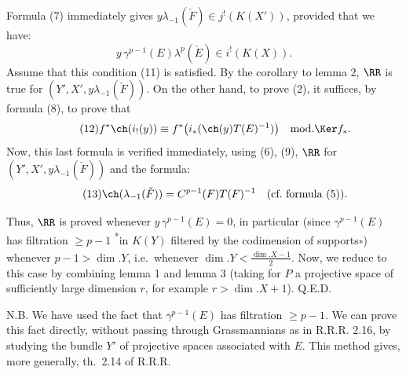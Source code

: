 %
Formula (7) immediately gives \(y\lambda_{-1}(\check F)\in j^!(K(X'))\), provided that we have:
\begin{equation}\tag{11}
  y\,\gamma^{p-1}(E)\lambda^p(\check E)\in i^!(K(X)).
\end{equation}
Assume that this condition (11) is satisfied. By the corollary to lemma 2, \(\RR\) is true for \((Y',X',y\lambda_{-1}(\check F))\). On the other hand, to prove (2), it suffices, by formula (8), to prove that
\begin{equation}\tag{12}
  f^*\ch(i_!(y))
  \equiv
  f^*\bigl(i_*(\ch(y)T(E)^{-1})\bigr)
  \quad\text{mod.}\Ker f_*.
\end{equation}
Now, this last formula is verified immediately, using (6), (9), \(\RR\) for \((Y',X',y\lambda_{-1}(\check F))\) and the formula:
\begin{equation}\tag{13}
  \ch(\lambda_{-1}(\check F))=C^{p-1}(F)T(F)^{-1}\quad\text{(cf.\ formula (5)).}
\end{equation}

Thus, \(\RR\) is proved whenever \(y\,\gamma^{p-1}(E)=0\), in particular (since \(\gamma^{p-1}(E)\) has filtration \(\geq p-1\) \textsuperscript{*}in \(K(Y)\) filtered by the codimension of supports\textsubscript{*}) whenever \(p-1>\dim.Y\), i.e.\ whenever \(\dim.Y<\frac{\dim.X-1}{2}\). Now, we reduce to this case by combining lemma 1 and lemma 3 (taking for \(P\) a projective space of sufficiently large dimension \(r\), for example \(r>\dim.X+1\)). Q.E.D.

N.B. We have used the fact that \(\gamma^{p-1}(E)\) has filtration \(\geq p-1\). We can prove this fact directly, without passing through Grassmannians as in \(\mathrm{R.R.R.}\) 2.16, by studying the bundle \(Y'\) of projective spaces associated with \(E\). This method gives, more generally, th.\ 2.14 of \(\mathrm{R.R.R.}\)

